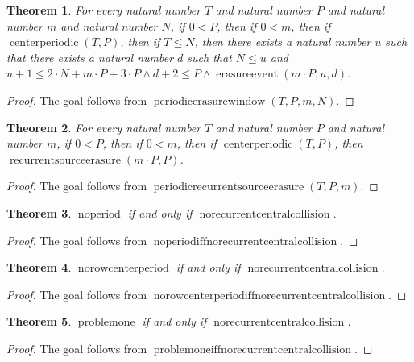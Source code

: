\documentclass[11pt]{article}
\newtheorem{theorem}{Theorem}[section]
\theoremstyle{definition}
\begin{document}
\begin{theorem}
\label{ll:observations:periodic-erasure-window}
For every natural number \(T\) and natural number \(P\) and natural number \(m\) and natural number \(N\), if \(0 < P\), then if \(0 < m\), then if \(\operatorname{centerperiodic}(T, P)\), then if \(T \le N\), then there exists a natural number \(u\) such that there exists a natural number \(d\) such that \(N \le u\) and \(u + 1 \le 2 \cdot N + m \cdot P + 3 \cdot P \land d + 2 \le P \land \operatorname{erasureevent}(m \cdot P, u, d)\).
\end{theorem}
\begin{proof}
The goal follows from \(\operatorname{periodicerasurewindow}(T, P, m, N)\).
\end{proof}
\begin{theorem}
\label{ll:observations:periodic-recurrent-source-erasure}
For every natural number \(T\) and natural number \(P\) and natural number \(m\), if \(0 < P\), then if \(0 < m\), then if \(\operatorname{centerperiodic}(T, P)\), then \(\operatorname{recurrentsourceerasure}(m \cdot P, P)\).
\end{theorem}
\begin{proof}
The goal follows from \(\operatorname{periodicrecurrentsourceerasure}(T, P, m)\).
\end{proof}
\begin{theorem}
\label{ll:observations:no-period-iff-no-recurrent-central-collision}
\(\operatorname{noperiod}\) if and only if \(\operatorname{norecurrentcentralcollision}\).
\end{theorem}
\begin{proof}
The goal follows from \(\operatorname{noperiodiffnorecurrentcentralcollision}\).
\end{proof}
\begin{theorem}
\label{ll:observations:no-row-center-period-iff-no-recurrent-central-collision}
\(\operatorname{norowcenterperiod}\) if and only if \(\operatorname{norecurrentcentralcollision}\).
\end{theorem}
\begin{proof}
The goal follows from \(\operatorname{norowcenterperiodiffnorecurrentcentralcollision}\).
\end{proof}
\begin{theorem}
\label{ll:observations:problem-one-iff-no-recurrent-central-collision}
\(\operatorname{problemone}\) if and only if \(\operatorname{norecurrentcentralcollision}\).
\end{theorem}
\begin{proof}
The goal follows from \(\operatorname{problemoneiffnorecurrentcentralcollision}\).
\end{proof}
\end{document}
